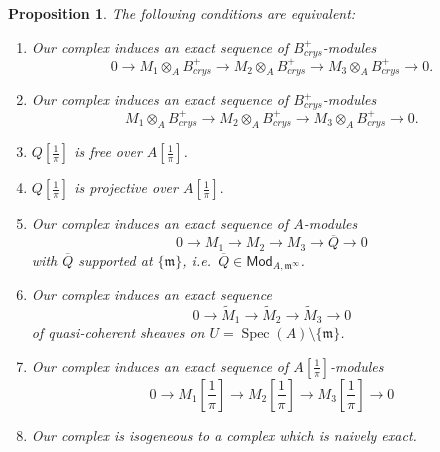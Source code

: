 \documentclass[11pt]{article}
\newtheorem{prop}[theo]{Proposition}
\theoremstyle{definition}
\numberwithin{equation}{section}
\numberwithin{figure}{section}
\numberwithin{table}{section}
\newcommand{\Mod}{\mathsf{Mod}}
\DeclareMathOperator{\Spec}{Spec}
\let\tilde\widetilde
\begin{document}
\begin{prop}\label{prop:ConditionsExactAlgebraic}
The following conditions are equivalent:
\begin{enumerate}
\item \label{3.14.1} Our complex induces an exact sequence of $B_{crys}^{+}$-modules
\[
0\rightarrow M_{1}\otimes_{A}B_{crys}^{+}\rightarrow M_{2}\otimes_{A}B_{crys}^{+}\rightarrow M_{3}\otimes_{A}B_{crys}^{+}\rightarrow0.
\]
\item \label{3.14.2} Our complex induces an exact sequence of $B_{crys}^{+}$-modules
\[
M_{1}\otimes_{A}B_{crys}^{+}\rightarrow M_{2}\otimes_{A}B_{crys}^{+}\rightarrow M_{3}\otimes_{A}B_{crys}^{+}\rightarrow0.
\]
\item \label{3.14.3} $Q[\frac{1}{\pi}]$ is free over $A[\frac{1}{\pi}]$.
\item \label{3.14.4} $Q[\frac{1}{\pi}]$ is projective over $A[\frac{1}{\pi}].$
\item \label{3.14.5} Our complex induces an exact sequence of $A$-modules
\[
0\rightarrow M_{1}\rightarrow M_{2}\rightarrow M_{3}\rightarrow\overline{Q}\rightarrow0
\]
with $\overline{Q}$ supported at $\{\mathfrak{m}\}$, i.e.~$\overline{Q}\in\Mod_{A,\mathfrak{m}^{\infty}}$.
\item \label{3.14.6} Our complex induces an exact sequence
\[
0\rightarrow\tilde{M}_{1}\rightarrow\tilde{M}_{2}\rightarrow\tilde{M}_{3}\rightarrow0
\]
of quasi-coherent sheaves on $U=\Spec(A)\setminus\{\mathfrak{m}\}$.
\item \label{3.14.7} Our complex induces an exact sequence of $A[\frac{1}{\pi}]$-modules
\[
0\rightarrow M_{1}\!\left[{\frac{1}{\pi}}\right]\rightarrow M_{2}\!\left[{\frac{1}{\pi}}\right]\rightarrow M_{3}\!\left[{\frac{1}{\pi}}\right]\rightarrow0
\]
\item \label{3.14.8} Our complex is isogeneous to a complex which is naively exact.
\end{enumerate}
\end{prop}
\end{document}
